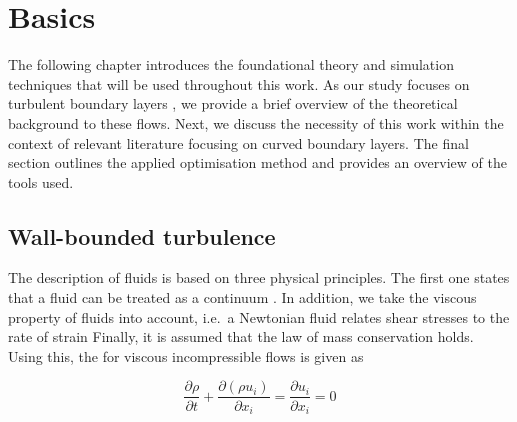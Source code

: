 
\chapter{Basics}
\label{chap:basics}
The following chapter introduces the foundational theory and simulation techniques that will be used throughout this work. As our study focuses on turbulent boundary layers , we provide a brief overview of the theoretical background to these flows. Next, we discuss the necessity of this work within the context of relevant literature focusing on curved boundary layers. The final section outlines the applied optimisation method and provides an overview of the tools used. 


\section{Wall-bounded turbulence}\label{sec:turbulenceTheory}


The description of fluids is based on three physical principles. 
The first one  states that a fluid can be treated as a continuum \citep{schlichting_boundary-layer_2017} .
In addition, we take the viscous property of fluids into account, i.e.~a Newtonian fluid relates shear stresses to the rate of strain \citep{tennekes_first_1972}
Finally, it is assumed that the law of mass conservation  holds.
Using this, the  for viscous incompressible flows is given 
as

\begin{equation}
    \frac{\partial \rho}{\partial t} + \frac{\partial (\rho u_i)}{\partial x_i} = \frac{\partial u_i}{\partial x_i} = 0
\end{equation}

